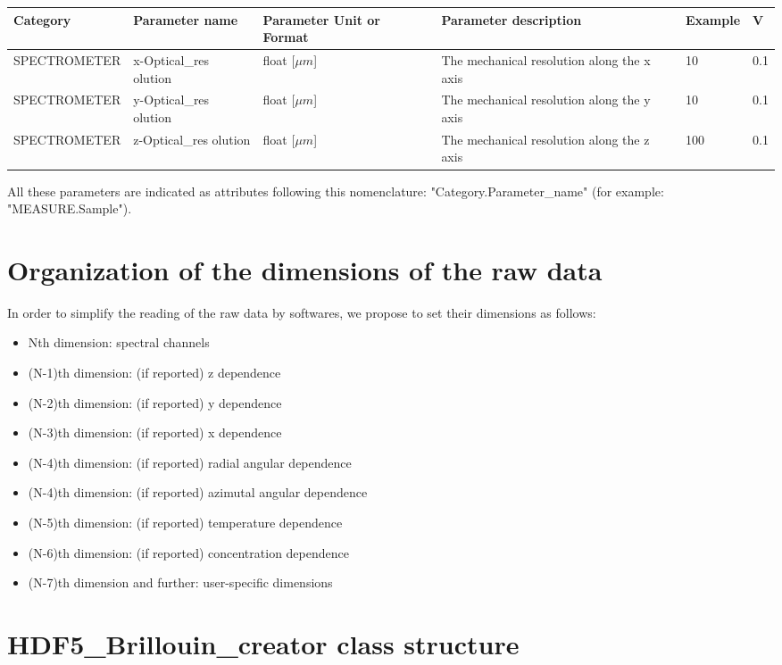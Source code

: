 \documentclass[11pt]{article}
\begin{document}
\begin{tabular}{|p{3.2cm}p{3cm}||p{2cm}|p{3cm}|p{1.8cm}|p{0.5cm}|}
  \hline
  Category & Parameter name & Parameter Unit or Format & Parameter description & Example & V \\
  \hline
  SPECTROMETER & x-Optical\_res olution & float [$\mu m$] & The mechanical resolution along the x axis & 10 & 0.1\\
  \hline
  SPECTROMETER & y-Optical\_res olution & float [$\mu m$] & The mechanical resolution along the y axis & 10 & 0.1\\
  \hline
  SPECTROMETER & z-Optical\_res olution & float [$\mu m$] & The mechanical resolution along the z axis & 100 & 0.1\\
  \hline
\end{tabular}


All these parameters are indicated as attributes following this nomenclature: "Category.Parameter\_name" (for example: "MEASURE.Sample").

\section{Organization of the dimensions of the raw data}

  In order to simplify the reading of the raw data by softwares, we propose to set their dimensions as follows:
  \begin{itemize}
    \item Nth dimension: spectral channels
    \item (N-1)th dimension: (if reported) z dependence
    \item (N-2)th dimension: (if reported) y dependence
    \item (N-3)th dimension: (if reported) x dependence
    \item (N-4)th dimension: (if reported) radial angular dependence
    \item (N-4)th dimension: (if reported) azimutal angular dependence
    \item (N-5)th dimension: (if reported) temperature dependence
    \item (N-6)th dimension: (if reported) concentration dependence
    \item (N-7)th dimension and further: user-specific dimensions
  \end{itemize}

\section{HDF5\_Brillouin\_creator class structure}
\end{document}
